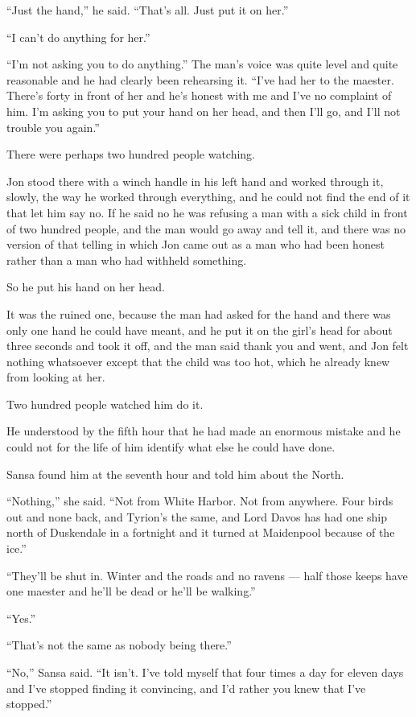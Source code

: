 “Just the hand,” he said. “That’s all. Just put it on her.”

“I can’t do anything for her.”

“I’m not asking you to do anything.” The man’s voice was quite level and quite reasonable and he had clearly been rehearsing it. “I’ve had her to the maester. There’s forty in front of her and he’s honest with me and I’ve no complaint of him. I’m asking you to put your hand on her head, and then I’ll go, and I’ll not trouble you again.”

There were perhaps two hundred people watching.

Jon stood there with a winch handle in his left hand and worked through it, slowly, the way he worked through everything, and he could not find the end of it that let him say no. If he said no he was refusing a man with a sick child in front of two hundred people, and the man would go away and tell it, and there was no version of that telling in which Jon came out as a man who had been honest rather than a man who had withheld something.

So he put his hand on her head.

It was the ruined one, because the man had asked for the hand and there was only one hand he could have meant, and he put it on the girl’s head for about three seconds and took it off, and the man said thank you and went, and Jon felt nothing whatsoever except that the child was too hot, which he already knew from looking at her.

Two hundred people watched him do it.

He understood by the fifth hour that he had made an enormous mistake and he could not for the life of him identify what else he could have done.

\sceneBreak

Sansa found him at the seventh hour and told him about the North.

“Nothing,” she said. “Not from White Harbor. Not from anywhere. Four birds out and none back, and Tyrion’s the same, and Lord Davos has had one ship north of Duskendale in a fortnight and it turned at Maidenpool because of the ice.”

“They’ll be shut in. Winter and the roads and no ravens — half those keeps have one maester and he’ll be dead or he’ll be walking.”

“Yes.”

“That’s not the same as nobody being there.”

“No,” Sansa said. “It isn’t. I’ve told myself that four times a day for eleven days and I’ve stopped finding it convincing, and I’d rather you knew that I’ve stopped.”

